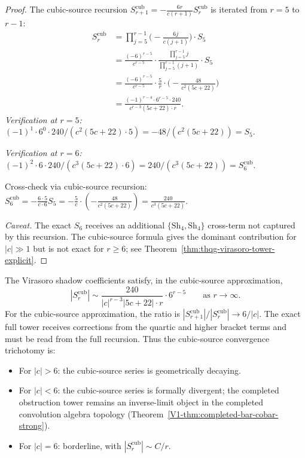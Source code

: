 \begin{proof}
The cubic-source recursion
$S_{r+1}^{\mathrm{cub}} = -\frac{6r}{c(r+1)}S_r^{\mathrm{cub}}$
is iterated from $r = 5$ to $r - 1$:
\begin{align*}
S_r^{\mathrm{cub}} &= \prod_{j=5}^{r-1}\bigl(-\frac{6j}{c(j+1)}\bigr)
 \cdot S_5 \\
&= \frac{(-6)^{r-5}}{c^{r-5}}
 \cdot \frac{\prod_{j=5}^{r-1} j}{\prod_{j=5}^{r-1}(j+1)}
 \cdot S_5 \\
&= \frac{(-6)^{r-5}}{c^{r-5}}
 \cdot \frac{5}{r}
 \cdot \bigl(-\frac{48}{c^2(5c+22)}\bigr) \\
&= \frac{(-1)^{r-4} \cdot 6^{r-5} \cdot 240}
 {c^{r-3}(5c+22) \cdot r}.
\end{align*}
\emph{Verification at $r = 5$:}
$(-1)^1 \cdot 6^0 \cdot 240 / (c^2(5c+22) \cdot 5)
= -48/(c^2(5c+22)) = S_5$. \checkmark

\emph{Verification at $r = 6$:}
$(-1)^2 \cdot 6 \cdot 240 / (c^3(5c+22) \cdot 6)
= 240/(c^3(5c+22)) = S_6^{\mathrm{cub}}$. \checkmark

Cross-check via cubic-source recursion:
$S_6^{\mathrm{cub}} = -\frac{6 \cdot 5}{c \cdot 6} S_5
= -\frac{5}{c} \cdot (-\frac{48}{c^2(5c+22)})
= \frac{240}{c^3(5c+22)}$. \checkmark

\smallskip
\noindent\textit{Caveat.}
The exact $S_6$ receives an additional
$\{\mathrm{Sh}_4, \mathrm{Sh}_4\}$ cross-term not captured
by this recursion. The cubic-source formula gives the
dominant contribution for $|c| \gg 1$ but is not exact for
$r \geq 6$; see
Theorem~\ref{thm:thqg-virasoro-tower-explicit}.
\end{proof}

\begin{corollary}
The Virasoro shadow coefficients satisfy, in the
cubic-source approximation,
\begin{equation}%
|S_r^{\mathrm{cub}}| \sim \frac{240}{|c|^{r-3}|5c+22| \cdot r}
\cdot 6^{r-5}
\qquad \text{as } r \to \infty.
\end{equation}
For the cubic-source approximation, the ratio is
$|S_{r+1}^{\mathrm{cub}}|/|S_r^{\mathrm{cub}}| \to 6/|c|$.
The exact full tower receives corrections from the quartic and higher
bracket terms and must be read from the full recursion. Thus the
cubic-source convergence trichotomy is:
\begin{itemize}
\item For $|c| > 6$: the cubic-source series is geometrically
 decaying.
\item For $|c| < 6$: the cubic-source series is formally divergent;
 the completed obstruction tower remains an inverse-limit object in the
 completed convolution algebra topology
 \textup{(}Theorem~\ref{V1-thm:completed-bar-cobar-strong}\textup{)}.
\item For $|c| = 6$: borderline, with
 $|S_r^{\mathrm{cub}}| \sim C/r$.
\end{itemize}
\end{corollary}

